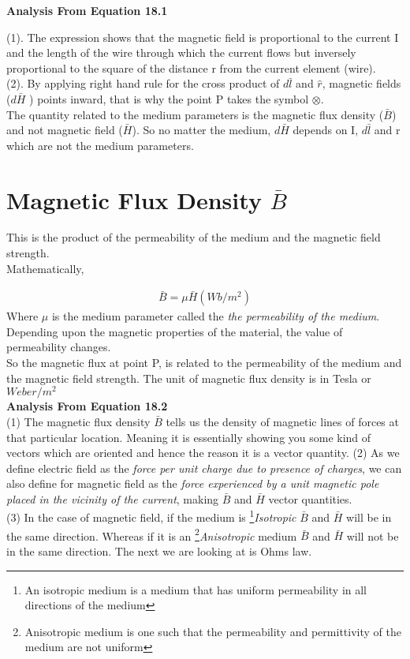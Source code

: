 \begin{flushleft}
	\textbf{Analysis From Equation 18.1} 
\end{flushleft}
(1). The expression shows that the magnetic field is proportional to the current I and the length of the wire through which the current flows but inversely proportional to the square of the distance r from the current element (wire).\\
(2). By applying right hand rule for the cross product of $d\bar{l}$ and $\hat{r}$, magnetic fields ($d\bar{H}$ ) points inward, that is why the point P takes the symbol $\otimes$.\\

The quantity related to the medium parameters is the magnetic flux density ($\bar{B}$) and not magnetic field ($\bar{H}$). So no matter the medium, $ d\bar{H} $ depends on I, $ d\bar{l} $ and r which are not the medium parameters. 
\section{Magnetic Flux Density $\bar{B}$}
This is the product of the permeability of the medium and the magnetic field strength.\\
Mathematically, 

\begin{align}
\boxed{\bar{B} = \mu\bar{H}} (Wb/m^{2})
\end{align}
Where $ \mu $ is the medium parameter called the \emph{the permeability of the medium}. \\

Depending upon the magnetic properties of the material, the value of permeability changes. \\
So the magnetic flux at point P, is related to the permeability of the medium and the magnetic field strength. The unit of magnetic flux density is in Tesla or $Weber/m^{2}$ \\

\textbf{Analysis From Equation 18.2}\\
(1) The magnetic flux density $\bar{B}$ tells us the density of magnetic lines of forces at that particular location. Meaning it is essentially showing you some kind of vectors which are oriented and hence the reason it is a vector quantity.
(2) As we define electric field as the  \emph{force per unit charge due to presence of charges}, we can also define for magnetic field as the \emph{force experienced by a unit magnetic pole placed in the vicinity of the current}, making $\bar{B}$ and $\bar{H}$ vector quantities.\\
(3) In the case of magnetic field, if the medium is \footnote[2]{An isotropic medium is a medium that has uniform permeability in all directions of the medium }\emph{Isotropic} $\bar{B}$ and $\bar{H}$ will be in the same direction. Whereas if it is an \footnote[3]{Anisotropic medium is one such that the permeability and permittivity of the medium are not uniform }\emph{Anisotropic} medium $\bar{B}$ and $\bar{H}$ will not be in the same direction. The next we are looking at is Ohms law.\\

